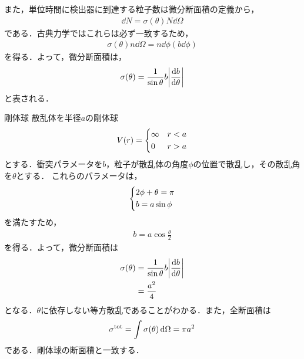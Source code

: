 \documentclass{report}
\begin{document}
  また，単位時間に検出器に到達する粒子数は微分断面積の定義から，
  \begin{align}
    \dd{N} = \sigma (\theta) N \dd{\Omega}
  \end{align}
  である．古典力学ではこれらは必ず一致するため，
  \begin{align}
    \sigma (\theta) n \dd{\Omega} = n \dd{\phi} (b \dd{\phi})
  \end{align}
  を得る．よって，微分断面積は，
  \begin{align}
    \sigma(\theta) = \frac{1}{\sin \theta} b \abs{\frac{\dd{b}}{\dd{\theta}}}
  \end{align}
  と表される．
  \begin{myex}{剛体球}{}
    散乱体を半径$a$の剛体球
    \begin{align}
      V(r) = 
      \begin{dcases}
        \infty & r < a \\
        0 & r > a
      \end{dcases}
    \end{align}
    とする．衝突パラメータを$b$，粒子が散乱体の角度$\phi$の位置で散乱し，その散乱角を$\theta$とする．
    これらのパラメータは，
    \begin{align}
      \begin{dcases}
        2\phi + \theta = \pi\\
        b = a\sin \phi
      \end{dcases}
    \end{align}
    を満たすため，
    \begin{align}
      b = a\cos \frac{\theta}{2}
    \end{align}
    を得る．よって，微分断面積は
    \begin{align}
    \sigma(\theta) &= \frac{1}{\sin \theta} b \abs{\frac{\dd{b}}{\dd{\theta}}}\\
    &= \frac{a^2}{4}
    \end{align}
    となる．$\theta$に依存しない等方散乱であることがわかる．また，全断面積は
    \begin{align}
      \sigma^{\mathrm{tot}} = \int \sigma(\theta) \dd{\Omega} = \pi a^2
    \end{align}
    である．剛体球の断面積と一致する．
  \end{myex}
\end{document}
